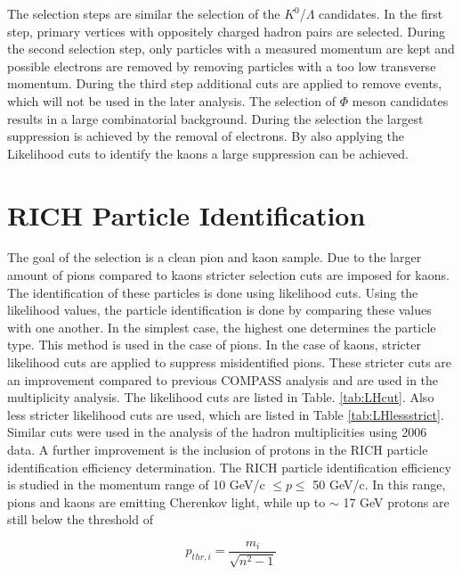 The selection steps are similar the selection of the $K^0$/$\Lambda$ candidates. In the first step, primary vertices with oppositely charged hadron pairs are selected. During the second selection step, only particles with a measured momentum are kept and possible electrons are removed by removing particles with a too low transverse momentum. During the third step additional cuts are applied to remove events, which will not be used in the later analysis. The selection of $\Phi$ meson candidates results in a large combinatorial background. During the selection the largest suppression is achieved by the removal of electrons. By also applying the Likelihood cuts to identify the kaons a large suppression can be achieved.

\section{RICH Particle Identification}

The goal of the selection is a clean pion and kaon sample. Due to the larger amount of pions compared to kaons stricter selection cuts are imposed for kaons. The identification of these particles is done using likelihood cuts. Using the likelihood values, the particle identification is done by comparing these values with one another. In the simplest case, the highest one determines the particle type. This method is used in the case of pions. In the case of kaons, stricter likelihood cuts are applied to suppress misidentified pions. These stricter cuts are an improvement compared to previous COMPASS analysis and are used in the multiplicity analysis. The likelihood cuts are listed in Table. \ref{tab:LHcut}. Also less stricter likelihood cuts are used, which are listed in Table \ref{tab:LHlessstrict}. Similar cuts were used in the analysis of the hadron multiplicities using 2006 data. A further improvement is the inclusion of protons in the RICH particle identification efficiency determination. The RICH particle identification efficiency is studied in the momentum range of 10 GeV/c $ \leq p \leq $ 50 GeV/c. In this range, pions and kaons are emitting Cherenkov light, while up to $\sim$ 17 GeV protons are still below the threshold of

\begin{equation}
  p_{thr,i} = \frac{m_i}{ \sqrt{n^{2}-1} }
\end{equation}

